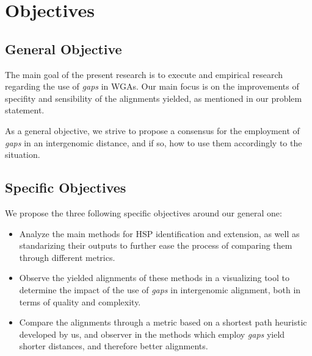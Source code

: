 \section{Objectives}

\subsection{General Objective}

The main goal of the present research is to execute and empirical research regarding the use of \textit{gaps} in WGAs. Our main focus is on the improvements of specifity and sensibility of the alignments yielded, as mentioned in our problem statement. 

\medskip

As a general objective, we strive to propose a consensus for the employment of \textit{gaps} in an intergenomic distance, and if so, how to use them accordingly to the situation.

\subsection{Specific Objectives}

We propose the three following specific objectives around our general one:

\begin{itemize}
  \item Analyze the main methods for HSP identification and extension, as well as standarizing their outputs to further ease the process of comparing them through different metrics.
  \item Observe the yielded alignments of these methods in a visualizing tool to determine the impact of the use of \textit{gaps} in intergenomic alignment, both in terms of quality and complexity.
  \item Compare the alignments through a metric based on a shortest path heuristic developed by us, and observer in the methods which employ \textit{gaps} yield shorter distances, and therefore better alignments.
\end{itemize}